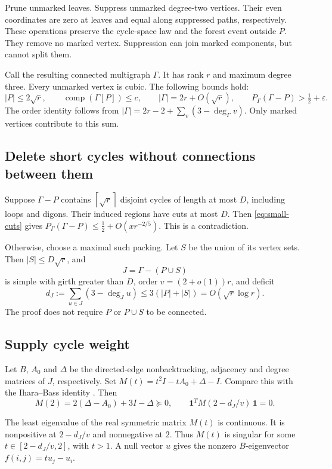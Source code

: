\documentclass[11pt,a4paper]{article}
\numberwithin{equation}{section}
\theoremstyle{definition}
\theoremstyle{remark}
\newcommand{\cc}{\operatorname{comp}}
\newcommand{\eps}{\varepsilon}
\newcommand{\ceil}[1]{\left\lceil#1\right\rceil}
\begin{document}
Prune unmarked leaves. Suppress unmarked degree-two vertices. Their even coordinates are zero at leaves and equal along suppressed paths, respectively. These operations preserve the cycle-space law and the forest event outside $P$. They remove no marked vertex. Suppression can join marked components, but cannot split them.

Call the resulting connected multigraph $\Gamma$. It has rank $r$ and maximum degree three. Every unmarked vertex is cubic. The following bounds hold:
\begin{equation}\label{eq:cubic}
 |P|\le2\sqrt r,\qquad\cc(\Gamma[P])\le c,\qquad|\Gamma|=2r+O(\sqrt r),\qquad P_\Gamma(\Gamma-P)>\tfrac12+\eps.
\end{equation}
The order identity follows from $|\Gamma|=2r-2+\sum_v(3-\deg_\Gamma v)$. Only marked vertices contribute to this sum.

\subsection{Delete short cycles without connections between them}\label{sec:short}
Suppose $\Gamma-P$ contains $\ceil{\sqrt r}$ disjoint cycles of length at most $D$, including loops and digons. Their induced regions have cuts at most $D$. Then \eqref{eq:small-cuts} gives $P_\Gamma(\Gamma-P)\le\frac12+O(xr^{-2/5})$. This is a contradiction.

Otherwise, choose a maximal such packing. Let $S$ be the union of its vertex sets. Then $|S|\le D\sqrt r$, and
\[
 J=\Gamma-(P\cup S)
\]
is simple with girth greater than $D$, order $v=(2+o(1))r$, and deficit
\begin{equation}\label{eq:deficit}
 d_J:=\sum_{u\in J}(3-\deg_Ju)\le3(|P|+|S|)=O(\sqrt r\log r).
\end{equation}
The proof does not require $P$ or $P\cup S$ to be connected.

\subsection{Supply cycle weight}\label{sec:supply}
Let $B$, $A_0$ and $\Delta$ be the directed-edge nonbacktracking, adjacency and degree matrices of $J$, respectively. Set $M(t)=t^2I-tA_0+\Delta-I$. Compare this with the Ihara--Bass identity \cite{Bass,KS}. Then
\[
 M(2)=2(\Delta-A_0)+3I-\Delta\succeq0,\qquad\mathbf 1^TM(2-d_J/v)\,\mathbf 1=0.
\]

The least eigenvalue of the real symmetric matrix $M(t)$ is continuous. It is nonpositive at $2-d_J/v$ and nonnegative at $2$. Thus $M(t)$ is singular for some $t\in[2-d_J/v,2]$, with $t>1$. A null vector $u$ gives the nonzero $B$-eigenvector $f(i,j)=tu_j-u_i$.
\end{document}
